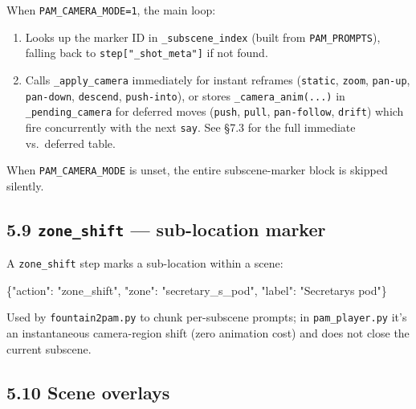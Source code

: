 \documentclass[
  12pt,
  letterpaper,
]{book}
\newenvironment{Shaded}{}{}
\newcommand{\DataTypeTok}[1]{\textcolor[rgb]{0.56,0.13,0.00}{#1}}
\newcommand{\FunctionTok}[1]{\textcolor[rgb]{0.02,0.16,0.49}{#1}}
\newcommand{\StringTok}[1]{\textcolor[rgb]{0.25,0.44,0.63}{#1}}
\providecommand{\tightlist}{%
  \setlength{\itemsep}{0pt}\setlength{\parskip}{0pt}}
\begin{document}
When \texttt{PAM\_CAMERA\_MODE=1}, the main loop:

\begin{enumerate}
\def\labelenumi{\arabic{enumi}.}
\tightlist
\item
  Looks up the marker ID in \texttt{\_subscene\_index} (built from
  \texttt{PAM\_PROMPTS}), falling back to
  \texttt{step{[}"\_shot\_meta"{]}} if not found.
\item
  Calls \texttt{\_apply\_camera} immediately for instant reframes
  (\texttt{static}, \texttt{zoom}, \texttt{pan-up}, \texttt{pan-down},
  \texttt{descend}, \texttt{push-into}), or stores
  \texttt{\_camera\_anim(...)} in \texttt{\_pending\_camera} for
  deferred moves (\texttt{push}, \texttt{pull}, \texttt{pan-follow},
  \texttt{drift}) which fire concurrently with the next \texttt{say}.
  See §7.3 for the full immediate vs.\ deferred table.
\end{enumerate}

When \texttt{PAM\_CAMERA\_MODE} is unset, the entire subscene-marker
block is skipped silently.

\subsection{\texorpdfstring{5.9 \texttt{zone\_shift} --- sub-location
marker}{5.9 zone\_shift --- sub-location marker}}\label{zone_shift-sub-location-marker}

A \texttt{zone\_shift} step marks a sub-location within a scene:

\begin{Shaded}
\begin{Highlighting}[]
\FunctionTok{\{}\DataTypeTok{"action"}\FunctionTok{:} \StringTok{"zone\_shift"}\FunctionTok{,} \DataTypeTok{"zone"}\FunctionTok{:} \StringTok{"secretary\_s\_pod"}\FunctionTok{,}
 \DataTypeTok{"label"}\FunctionTok{:} \StringTok{"Secretary\textquotesingle{}s pod"}\FunctionTok{\}}
\end{Highlighting}
\end{Shaded}

Used by \texttt{fountain2pam.py} to chunk per-subscene prompts; in
\texttt{pam\_player.py} it's an instantaneous camera-region shift (zero
animation cost) and does not close the current subscene.

\subsection{5.10 Scene overlays}\label{scene-overlays}
\end{document}
